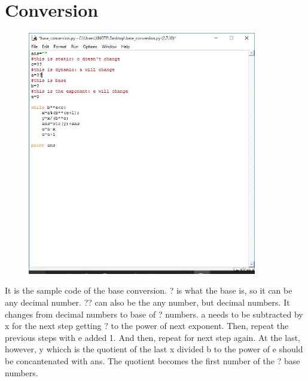 \section{Conversion}
\begin{figure}
\includegraphics[width=10cm]{BaseConversion.jpg}
\end{figure}
It is the sample code of the base conversion. ? is what the base is, so it can be any decimal number. ?? can also be the any number, but decimal numbers. It changes from decimal numbers to base of ? numbers. a needs to be subtracted by x for the next step getting ? to the power of next exponent. Then, repeat the previous steps with e added 1. And then, repeat for next step again. At the last, however, y whicch is the quotient of the last x divided b to the power of e should be concantenated with ans. The quotient becomes the first number of the ? base numbers.
